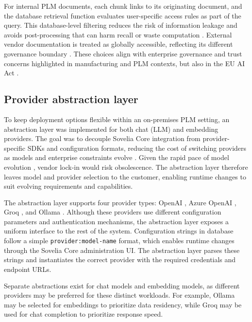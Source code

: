 For internal PLM documents, each chunk links to its originating document, and the database retrieval function evaluates user-specific access rules as part of the query. This database-level filtering reduces the risk of information leakage and avoids post-processing that can harm recall or waste computation \parencite{zhongHoneyBeeEfficientRolebased2025}. External vendor documentation is treated as globally accessible, reflecting its different governance boundary \parencite{jeongPermissionAwareRAGIdentity2025}. These choices align with enterprise governance and trust concerns highlighted in manufacturing and PLM contexts, but also in the EU AI Act \parencite{wangArtificialIntelligenceProduct2021, sillbergEUAIAct2025}.

\subsection{Provider abstraction layer}
\label{subsec:provider-abstraction-layer}

To keep deployment options flexible within an on-premises PLM setting, an abstraction layer was implemented for both chat (LLM) and embedding providers. The goal was to decouple Sovelia Core integration from provider-specific SDKs and configuration formats, reducing the cost of switching providers as models and enterprise constraints evolve \parencite{opara-martinsCriticalAnalysisVendor2016, wangLargeLanguageModel2025}. Given the rapid pace of model evolution \parencite{maslejArtificialIntelligenceIndex2025a}, vendor lock-in would risk obsolescence. The abstraction layer therefore leaves model and provider selection to the customer, enabling runtime changes to suit evolving requirements and capabilities.

The abstraction layer supports four provider types: OpenAI \cite{APIPlatformOpenAI}, Azure OpenAI \cite{microsoftWhatAzureOpenAI}, Groq \cite{GroqFastLow2025}, and Ollama \cite{Ollama}. Although these providers use different configuration parameters and authentication mechanisms, the abstraction layer exposes a uniform interface to the rest of the system. Configuration strings in database follow a simple \texttt{provider:model-name} format, which enables runtime changes through the Sovelia Core administration UI. The abstraction layer parses these strings and instantiates the correct provider with the required credentials and endpoint URLs.

Separate abstractions exist for chat models and embedding models, as different providers may be preferred for these distinct workloads. For example, Ollama may be selected for embeddings to prioritize data residency, while Groq may be used for chat completion to prioritize response speed.

